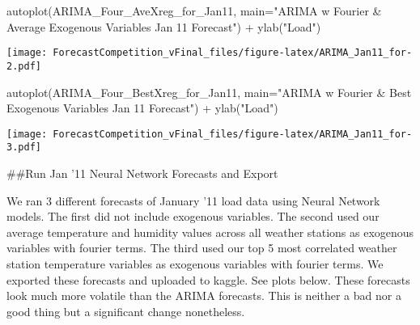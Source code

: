 \documentclass[
]{article}
\newenvironment{Shaded}{\begin{snugshade}}{\end{snugshade}}
\newcommand{\AttributeTok}[1]{\textcolor[rgb]{0.77,0.63,0.00}{#1}}
\newcommand{\CommentTok}[1]{\textcolor[rgb]{0.56,0.35,0.01}{\textit{#1}}}
\newcommand{\ConstantTok}[1]{\textcolor[rgb]{0.00,0.00,0.00}{#1}}
\newcommand{\FunctionTok}[1]{\textcolor[rgb]{0.00,0.00,0.00}{#1}}
\newcommand{\NormalTok}[1]{#1}
\newcommand{\SpecialCharTok}[1]{\textcolor[rgb]{0.00,0.00,0.00}{#1}}
\newcommand{\StringTok}[1]{\textcolor[rgb]{0.31,0.60,0.02}{#1}}
\begin{document}
\begin{Shaded}
\begin{Highlighting}[]
\FunctionTok{autoplot}\NormalTok{(ARIMA\_Four\_AveXreg\_for\_Jan11, }\AttributeTok{main=}\StringTok{"ARIMA w Fourier \& Average Exogenous Variables Jan \textquotesingle{}11 Forecast"}\NormalTok{) }\SpecialCharTok{+} \FunctionTok{ylab}\NormalTok{(}\StringTok{"Load"}\NormalTok{)}
\end{Highlighting}
\end{Shaded}

\texttt{[image: ForecastCompetition\_vFinal\_files/figure-latex/ARIMA\_Jan11\_for-2.pdf]}

\begin{Shaded}
\begin{Highlighting}[]
\FunctionTok{autoplot}\NormalTok{(ARIMA\_Four\_BestXreg\_for\_Jan11, }\AttributeTok{main=}\StringTok{"ARIMA w Fourier \& Best Exogenous Variables Jan \textquotesingle{}11 Forecast"}\NormalTok{) }\SpecialCharTok{+} \FunctionTok{ylab}\NormalTok{(}\StringTok{"Load"}\NormalTok{)}
\end{Highlighting}
\end{Shaded}

\texttt{[image: ForecastCompetition\_vFinal\_files/figure-latex/ARIMA\_Jan11\_for-3.pdf]}

\begin{Shaded}
\end{Shaded}

\#\#Run Jan '11 Neural Network Forecasts and Export

We ran 3 different forecasts of January '11 load data using Neural
Network models. The first did not include exogenous variables. The
second used our average temperature and humidity values across all
weather stations as exogenous variables with fourier terms. The third
used our top 5 most correlated weather station temperature variables as
exogenous variables with fourier terms. We exported these forecasts and
uploaded to kaggle. See plots below. These forecasts look much more
volatile than the ARIMA forecasts. This is neither a bad nor a good
thing but a significant change nonetheless.
\end{document}
